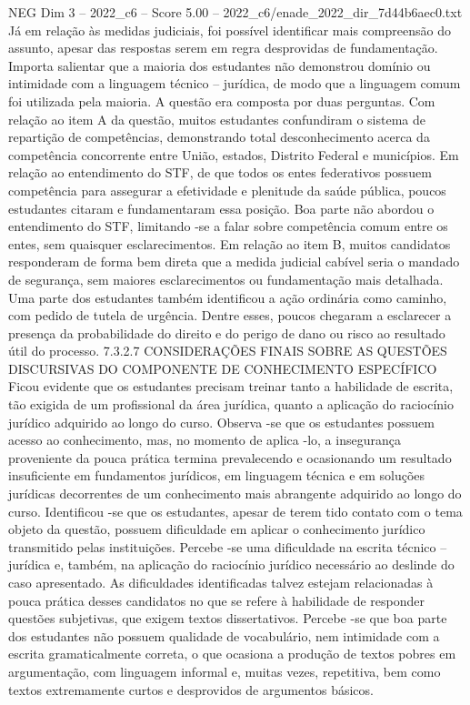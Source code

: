 \begin{textsample}{NEG Dim 3 – 2022\_c6 – Score 5.00 – 2022\_c6/enade\_2022\_dir\_7d44b6aec0.txt}
Já em relação às medidas judiciais, foi possível identificar mais compreensão do assunto, apesar das respostas serem em regra desprovidas de fundamentação.
Importa salientar que a maioria dos estudantes não demonstrou domínio ou intimidade com a linguagem técnico – jurídica, de modo que a linguagem comum foi utilizada pela maioria.
A questão era composta por duas perguntas.
Com relação ao item A da questão, muitos estudantes confundiram o sistema de repartição de competências, demonstrando total desconhecimento acerca da competência concorrente entre União, estados, Distrito Federal e municípios.
Em relação ao entendimento do STF, de que todos os entes federativos possuem competência para assegurar a efetividade e plenitude da saúde pública, poucos estudantes citaram e fundamentaram essa posição.
Boa parte não abordou o entendimento do STF, limitando -se a falar sobre competência comum entre os entes, sem quaisquer esclarecimentos.
Em relação ao item B, muitos candidatos responderam de forma bem direta que a medida judicial cabível seria o mandado de segurança, sem maiores esclarecimentos ou fundamentação mais detalhada.
Uma parte dos estudantes também identificou a ação ordinária como caminho, com pedido de tutela de urgência.
Dentre esses, poucos chegaram a esclarecer a presença da probabilidade do direito e do perigo de dano ou risco ao resultado útil do processo. 7.3.2.7 CONSIDERAÇÕES FINAIS SOBRE AS QUESTÕES DISCURSIVAS DO COMPONENTE DE CONHECIMENTO ESPECÍFICO Ficou evidente que os estudantes precisam treinar tanto a habilidade de escrita, tão exigida de um profissional da área jurídica, quanto a aplicação do raciocínio jurídico adquirido ao longo do curso.
Observa -se que os estudantes possuem acesso ao conhecimento, mas, no momento de aplica -lo, a insegurança proveniente da pouca prática termina prevalecendo e ocasionando um resultado insuficiente em fundamentos jurídicos, em linguagem técnica e em soluções jurídicas decorrentes de um conhecimento mais abrangente adquirido ao longo do curso.
Identificou -se que os estudantes, apesar de terem tido contato com o tema objeto da questão, possuem dificuldade em aplicar o conhecimento jurídico transmitido pelas instituições.
Percebe -se uma dificuldade na escrita técnico – jurídica e, também, na aplicação do raciocínio jurídico necessário ao deslinde do caso apresentado.
As dificuldades identificadas talvez estejam relacionadas à pouca prática desses candidatos no que se refere à habilidade de responder questões subjetivas, que exigem textos dissertativos.
Percebe -se que boa parte dos estudantes não possuem qualidade de vocabulário, nem intimidade com a escrita gramaticalmente correta, o que ocasiona a produção de textos pobres em argumentação, com linguagem informal e, muitas vezes, repetitiva, bem como textos extremamente curtos e desprovidos de argumentos básicos.

\end{textsample}
